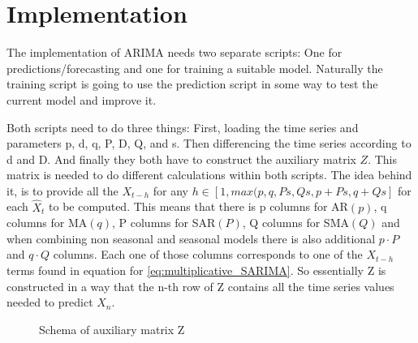 \chapter{Implementation}

The implementation of ARIMA needs two separate scripts: One for predictions/forecasting and one for training a suitable model.
Naturally the training script is going to use the prediction script in some way to test the current model and improve it.

Both scripts need to do three things: 
First, loading the time series and parameters p, d, q, P, D, Q, and s. Then differencing the time series according to d and D. And finally they both have to construct the auxiliary matrix $Z$. This matrix is needed to do different calculations within both scripts. The idea behind it, is to provide all the $X_{t-h}$ for any $h \in [1, max(p, q, Ps, Qs, p + Ps, q + Qs]$ for each $\hat{X}_t$ to be computed.
This means that there is p columns for \acs{AR}$(p)$, q columns for \acs{MA}$(q)$, P columns for \acs{SAR}$(P)$, Q columns for \acs{SMA}$(Q)$ and when combining non seasonal and seasonal models there is also additional $p \cdot P$ and $q \cdot Q$ columns. Each one of those columns corresponds to one of the $X_{t-h}$ terms found in equation for \eqref{eq:multiplicative_SARIMA}. So essentially Z is constructed in a way that the n-th row of Z contains all the time series values needed to predict $X_n$.

\begin{figure}[ht]
	\centering
    \caption{Schema of auxiliary matrix Z}
\end{figure}

